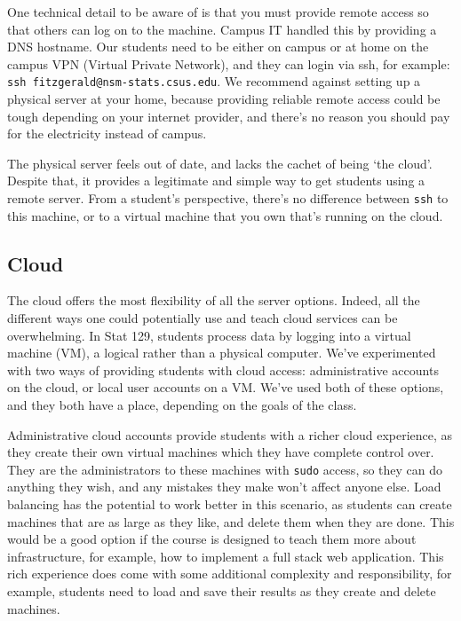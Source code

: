 \documentclass[12pt]{article}
\begin{document}
One technical detail to be aware of is that you must provide remote access so that others can log on to the machine.
Campus IT handled this by providing a DNS hostname.
Our students need to be either on campus or at home on the campus VPN (Virtual Private Network), and they can login via ssh, for example: \texttt{ssh fitzgerald@nsm-stats.csus.edu}.
We recommend against setting up a physical server at your home, because providing reliable remote access could be tough depending on your internet provider, and there's no reason you should pay for the electricity instead of campus.

The physical server feels out of date, and lacks the cachet of being `the cloud'.
Despite that, it provides a legitimate and simple way to get students using a remote server.
From a student's perspective, there's no difference between \texttt{ssh} to this machine, or to a virtual machine that you own that's running on the cloud.

\subsection{Cloud}

The cloud offers the most flexibility of all the server options.
Indeed, all the different ways one could potentially use and teach cloud services can be overwhelming.
In Stat 129, students process data by logging into a virtual machine (VM), a logical rather than a physical computer.
We've experimented with two ways of providing students with cloud access: administrative accounts on the cloud, or local user accounts on a VM.
We've used both of these options, and they both have a place, depending on the goals of the class.

Administrative cloud accounts provide students with a richer cloud experience, as they create their own virtual machines which they have complete control over.
They are the administrators to these machines with \texttt{sudo} access, so they can do anything they wish, and any mistakes they make won't affect anyone else.
Load balancing has the potential to work better in this scenario, as students can create machines that are as large as they like, and delete them when they are done.
This would be a good option if the course is designed to teach them more about infrastructure, for example, how to implement a full stack web application.
This rich experience does come with some additional complexity and responsibility, for example, students need to load and save their results as they create and delete machines.
\end{document}
